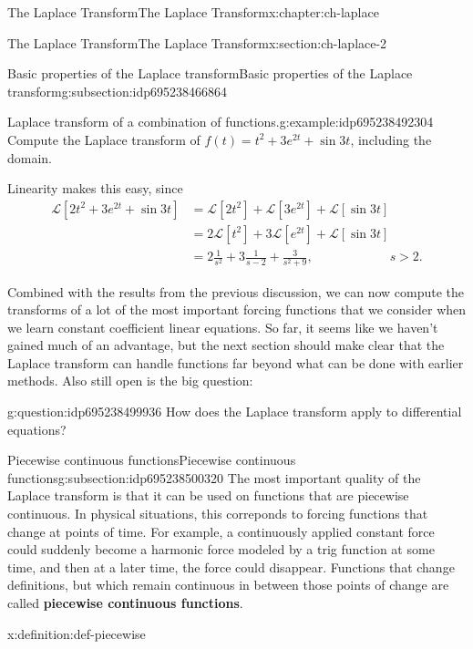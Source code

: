 \documentclass[oneside,10pt,]{book}
\newcommand{\terminology}[1]{\textbf{#1}}
\numberwithin{equation}{section}
\numberwithin{equation}{section}
\newcommand{\amp}{&}
\begin{document}
\begin{chapterptx}{The Laplace Transform}{}{The Laplace Transform}{}{}{x:chapter:ch-laplace}
\begin{sectionptx}{The Laplace Transform}{}{The Laplace Transform}{}{}{x:section:ch-laplace-2}
\begin{subsectionptx}{Basic properties of the Laplace transform}{}{Basic properties of the Laplace transform}{}{}{g:subsection:idp695238466864}
\begin{equation}
\end{equation}
%
\begin{example}{Laplace transform of a combination of functions.}{g:example:idp695238492304}%
Compute the Laplace transform of \(f(t) = t^2 + 3e^{2t} + \sin 3t\), including the domain.%
\par
Linearity makes this easy, since%
\begin{align*}
\mathcal{L}[2t^2 + 3e^{2t} + \sin 3t] \amp= \mathcal{L}[2t^2] + \mathcal{L}[3e^{2t}] + \mathcal{L}[\sin 3t]\\
\amp= 2\mathcal{L}[t^2] + 3\mathcal{L}[e^{2t}] + \mathcal{L}[\sin 3t]\\
\amp= 2\frac{1}{s^2} + 3\frac{1}{s-2} + \frac{3}{s^2 + 9}, \hspace{1in} s > 2.
\end{align*}
%
\end{example}
Combined with the results from the previous discussion, we can now compute the transforms of a lot of the most important forcing functions that we consider when we learn constant coefficient linear equations. So far, it seems like we haven't gained much of an advantage, but the next section should make clear that the Laplace transform can handle functions far beyond what can be done with earlier methods. Also still open is the big question: \begin{question}{}{g:question:idp695238499936}%
How does the Laplace transform apply to differential equations?%
\end{question}
%
\end{subsectionptx}
%
%
\typeout{************************************************}
\typeout{************************************************}
%
\begin{subsectionptx}{Piecewise continuous functions}{}{Piecewise continuous functions}{}{}{g:subsection:idp695238500320}
The most important quality of the Laplace transform is that it can be used on functions that are piecewise continuous. In physical situations, this correponds to forcing functions that change at points of time. For example, a continuously applied constant force could suddenly become a harmonic force modeled by a trig function at some time, and then at a later time, the force could disappear. Functions that change definitions, but which remain continuous in between those points of change are called \terminology{piecewise continuous functions}.%
\begin{definition}{}{x:definition:def-piecewise}%

\end{definition}
\end{subsectionptx}
\end{sectionptx}
\end{chapterptx}
\end{document}
